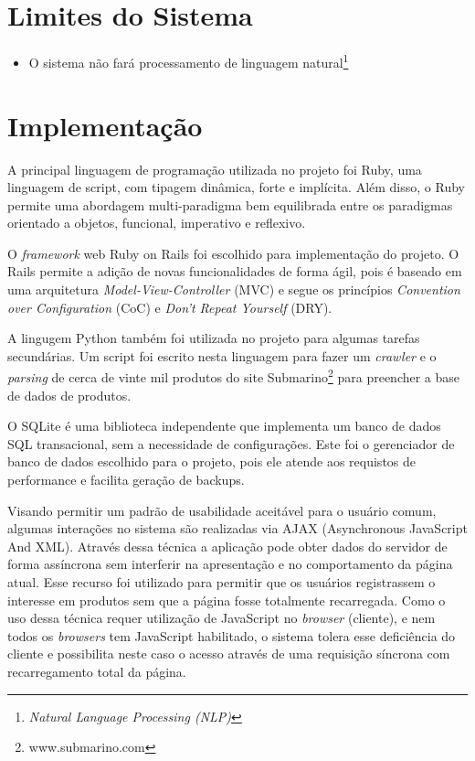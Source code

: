 \section{Limites do Sistema}

\begin{itemize}
  
    \item O sistema não fará processamento de linguagem natural\footnote{\textit{Natural Language Processing (NLP)}}

\end{itemize}

\section{Implementação} %
\label{sec:implementacao}

A principal linguagem de programação utilizada no projeto foi Ruby, uma linguagem de script, com tipagem dinâmica, forte e implícita. Além disso, o Ruby permite uma abordagem multi-paradigma bem equilibrada entre os paradigmas orientado a objetos, funcional, imperativo e reflexivo. 

O \emph{framework} web Ruby on Rails foi escolhido para implementação do projeto. O Rails permite a adição de novas funcionalidades de forma ágil, pois é baseado em uma arquitetura \emph{Model-View-Controller}\cite{burbeck1992applications} (MVC) e segue os princípios \emph{Convention over Configuration}\cite{hansson2006convention} (CoC) e \emph{Don't Repeat Yourself}\cite{hunt-don} (DRY).

A lingugem Python também foi utilizada no projeto para algumas tarefas secundárias. Um script foi escrito nesta linguagem para fazer um \emph{crawler} e o \emph{parsing} de cerca de vinte mil produtos do site Submarino\footnote{www.submarino.com} para preencher a base de dados de produtos.

O SQLite é uma biblioteca independente que implementa um banco de dados SQL transacional, sem a necessidade de configurações. Este foi o gerenciador de banco de dados escolhido para o projeto, pois ele atende aos requistos de performance e facilita geração de backups.

Visando permitir um padrão de usabilidade aceitável para o usuário comum, algumas interações no sistema são realizadas via AJAX (Asynchronous JavaScript And XML). Através dessa técnica a aplicação pode obter dados do servidor de forma assíncrona sem interferir na apresentação e no comportamento da página atual. Esse recurso foi utilizado para permitir que os usuários registrassem o interesse em produtos sem que a página fosse totalmente recarregada. Como o uso dessa técnica requer utilização de JavaScript no \emph{browser} (cliente), e nem todos os \emph{browsers} tem JavaScript habilitado, o sistema tolera esse deficiência do cliente e possibilita neste caso o acesso através de uma requisição síncrona com recarregamento total da página.

